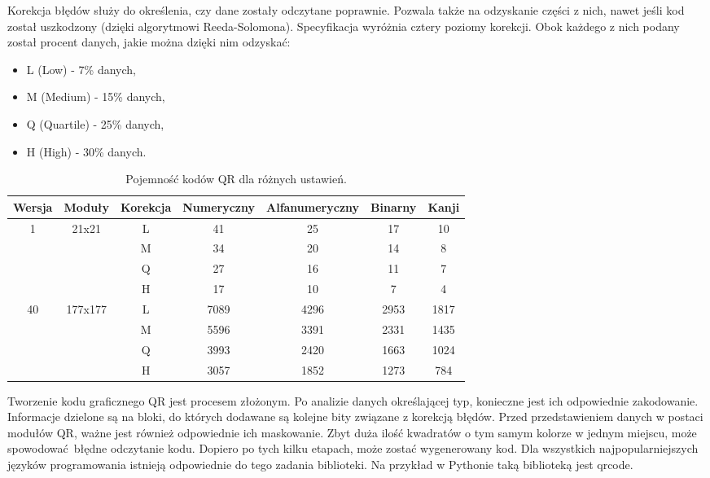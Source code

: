 Korekcja błędów służy do określenia, czy dane zostały odczytane poprawnie. Pozwala także na odzyskanie części z nich, nawet jeśli kod został uszkodzony (dzięki algorytmowi Reeda-Solomona). Specyfikacja wyróżnia cztery poziomy korekcji. Obok każdego z nich podany został procent danych, jakie można dzięki nim odzyskać:

\begin{itemize}
	\item L (Low) - 7\% danych,
	\item M (Medium) - 15\% danych,
	\item Q (Quartile) - 25\% danych,
	\item H (High) - 30\% danych.
\end{itemize}

\begin{table}[h]
	\caption{Pojemność kodów QR dla różnych ustawień.}
	\vspace{0.3cm}
	\begin{center}
		\begin{tabular}{| c | c | c | c | c | c | c |}
			\hline
			Wersja & Moduły & Korekcja & Numeryczny & Alfanumeryczny & Binarny & Kanji\\
			\hline
			\multirow{4}{*}{1} & \multirow{4}{*}{21x21}&L&41&25&17&10\\
			& & M&34&20&14&8\\
			& & Q&27&16&11&7\\
			& & H&17&10&7&4\\
			\hline
			\multirow{4}{*}{40} & \multirow{4}{*}{177x177}&L&7089&4296&2953&1817\\
			& & M&5596&3391&2331&1435\\
			& & Q&3993&2420&1663&1024\\
			& & H&3057&1852&1273&784\\
			\hline
		\end{tabular}
	\end{center}
\end{table}

Tworzenie kodu graficznego QR jest procesem złożonym. Po analizie danych określającej typ, konieczne jest ich odpowiednie zakodowanie. Informacje dzielone są na bloki, do których dodawane są kolejne bity związane z korekcją błędów. Przed przedstawieniem danych w postaci modułów QR, ważne jest również odpowiednie ich maskowanie. Zbyt duża ilość kwadratów o tym samym kolorze w jednym miejscu, może spowodować błędne odczytanie kodu. Dopiero po tych kilku etapach, może zostać wygenerowany kod. Dla wszystkich najpopularniejszych języków programowania istnieją odpowiednie do tego zadania biblioteki. Na przykład w Pythonie taką biblioteką jest qrcode.


